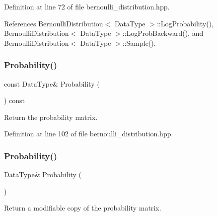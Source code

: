 Definition at line 72 of file bernoulli\+\_\+distribution.\+hpp.



References Bernoulli\+Distribution$<$ Data\+Type $>$\+::\+Log\+Probability(), Bernoulli\+Distribution$<$ Data\+Type $>$\+::\+Log\+Prob\+Backward(), and Bernoulli\+Distribution$<$ Data\+Type $>$\+::\+Sample().

\mbox{\label{classmlpack_1_1ann_1_1BernoulliDistribution_aa9aa637b51801aaa39ae77be9b6d9280}} 
\subsubsection{Probability()\hspace{0.1cm}{\footnotesize\ttfamily [2/3]}}
{\footnotesize\ttfamily const Data\+Type\& Probability (\begin{DoxyParamCaption}{ }\end{DoxyParamCaption}) const\hspace{0.3cm}{\ttfamily [inline]}}



Return the probability matrix. 



Definition at line 102 of file bernoulli\+\_\+distribution.\+hpp.

\mbox{\label{classmlpack_1_1ann_1_1BernoulliDistribution_a11883ea7fd2a81bdd492d58f1ae13ed6}} 
\subsubsection{Probability()\hspace{0.1cm}{\footnotesize\ttfamily [3/3]}}
{\footnotesize\ttfamily Data\+Type\& Probability (\begin{DoxyParamCaption}{ }\end{DoxyParamCaption})\hspace{0.3cm}{\ttfamily [inline]}}



Return a modifiable copy of the probability matrix. 



